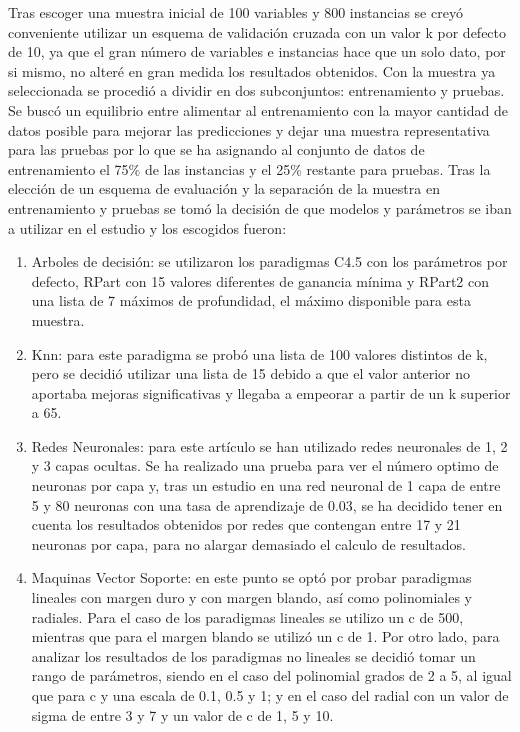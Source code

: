 \documentclass[10pt,twocolumn,letterpaper,a4paper]{article}
\begin{document}
Tras escoger una muestra inicial de 100 variables y 800 instancias se creyó conveniente utilizar un esquema de validación cruzada con un valor k por defecto de 10, ya que el gran número de variables e instancias hace que un solo dato, por si mismo, no alteré en gran medida los resultados obtenidos. 
Con la muestra ya seleccionada se procedió a dividir en dos subconjuntos: entrenamiento y pruebas. Se buscó un equilibrio entre alimentar al entrenamiento con la mayor cantidad de datos posible para mejorar las predicciones y dejar una muestra representativa para las pruebas por lo que se ha asignando al conjunto de datos de entrenamiento el 75\% de las instancias y el 25\% restante para pruebas.
Tras la elección de un esquema de evaluación y la separación de la muestra en entrenamiento y pruebas se tomó la decisión de que modelos y parámetros se iban a utilizar en el estudio y los escogidos fueron:
\begin{enumerate}
  \item Arboles de decisión: se utilizaron los paradigmas C4.5 con los parámetros por defecto, RPart con 15 valores diferentes de ganancia mínima y RPart2 con una lista de 7 máximos de profundidad, el máximo disponible para esta muestra.
  \item Knn: para este paradigma se probó una lista de 100 valores distintos de k, pero se decidió utilizar una lista de 15 debido a que el valor anterior no aportaba mejoras significativas y llegaba a empeorar a partir de un k superior a 65.
  \item Redes Neuronales: para este artículo se han utilizado redes neuronales de 1, 2 y 3 capas ocultas. Se ha realizado una prueba para ver el número optimo de neuronas por capa y, tras un estudio en una red neuronal de 1 capa de entre 5 y 80 neuronas con una tasa de aprendizaje de 0.03, se ha decidido tener en cuenta los resultados obtenidos por redes que contengan entre 17 y 21 neuronas por capa, para no alargar demasiado el calculo de resultados.
  \item Maquinas Vector Soporte: en este punto se optó por probar paradigmas lineales con margen duro y con margen blando, así como polinomiales y radiales. Para el caso de los paradigmas lineales se utilizo un c de 500, mientras que para el margen blando se utilizó un c de 1. Por otro lado, para analizar los resultados de los paradigmas no lineales se decidió tomar un rango de parámetros, siendo en el caso del polinomial grados de 2 a 5, al igual que para c y una escala de 0.1, 0.5 y 1; y en el caso del radial con un valor de sigma de entre 3 y 7 y un valor de c de 1, 5 y 10.
\end{enumerate}
\end{document}
